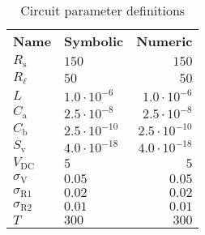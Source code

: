\begin{table}[H]
\centering
\begin{tabular}[c]{llr}
\textbf{Name} & \textbf{Symbolic} & \textbf{Numeric} \\ 
\rowcolor{myyellow}
$R_{\mathrm{s}}$ &$150$ &$150$ \\ 
$R_{\ell}$ &$50$ &$50$ \\ 
\rowcolor{myyellow}
$L$ &$1.0 \cdot 10^{-6}$ &$1.0 \cdot 10^{-6}$ \\ 
$C_{\mathrm{a}}$ &$2.5 \cdot 10^{-8}$ &$2.5 \cdot 10^{-8}$ \\ 
\rowcolor{myyellow}
$C_{\mathrm{b}}$ &$2.5 \cdot 10^{-10}$ &$2.5 \cdot 10^{-10}$ \\ 
$S_{\mathrm{v}}$ &$4.0 \cdot 10^{-18}$ &$4.0 \cdot 10^{-18}$ \\ 
\rowcolor{myyellow}
$V_{\mathrm{DC}}$ &$5$ &$5$ \\ 
$\sigma_{\mathrm{V}}$ &$0.05$ &$0.05$ \\ 
\rowcolor{myyellow}
$\sigma_{\mathrm{R1}}$ &$0.02$ &$0.02$ \\ 
$\sigma_{\mathrm{R2}}$ &$0.01$ &$0.01$ \\ 
\rowcolor{myyellow}
$T$ &$300$ &$300$ \\ 
\end{tabular}
\caption{Circuit parameter definitions}
\label{tab-pardefs}
\end{table}

